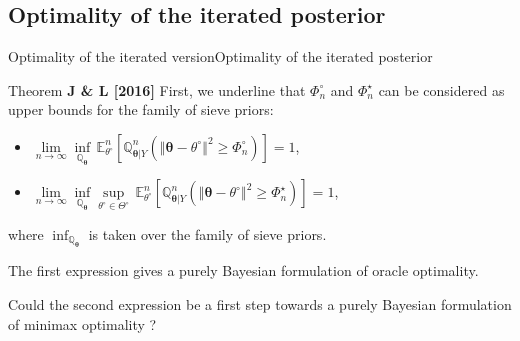 \documentclass[10pt]{beamer}
\begin{document}
\subsection{Optimality of the iterated posterior}
\begin{frame}{Optimality of the iterated version}{Optimality of the iterated posterior}

\begin{block}{Theorem \textbf{J \& L [2016]}}
First, we underline that $\Phi_{n}^{\circ}$ and $\Phi_{n}^{\star}$ can be considered as upper bounds for the family of sieve priors:
\begin{itemize}
\item $\lim\limits_{n \rightarrow \infty} \inf\limits_{\mathbb{Q}_{\boldsymbol{\theta}}}\, \mathbb{E}_{\theta^{\circ}}^{n}\left[\mathbb{Q}_{\boldsymbol{\theta} \vert Y}^{n}\left(\left\Vert \boldsymbol{\theta} - \theta^{\circ} \right\Vert^{2} \geq \Phi_{n}^{\circ}\right)\right] = 1$,
\item $\lim\limits_{n \rightarrow \infty} \inf\limits_{\mathbb{Q}_{\boldsymbol{\theta}}}\sup\limits_{\theta^{\circ} \in \Theta^{\circ}}\, \mathbb{E}_{\theta^{\circ}}^{n}\left[\mathbb{Q}_{\boldsymbol{\theta} \vert Y}^{n}\left(\left\Vert \boldsymbol{\theta} - \theta^{\circ} \right\Vert^{2} \geq \Phi_{n}^{\star}\right)\right] = 1$,
\end{itemize}
where $\inf_{\mathbb{Q}_{\boldsymbol{\theta}}}$ is taken over the family of sieve priors.
\end{block}
The first expression gives a purely Bayesian formulation of oracle optimality.

Could the second expression be a first step towards a purely Bayesian formulation of minimax optimality ?
\end{frame}
\end{document}
